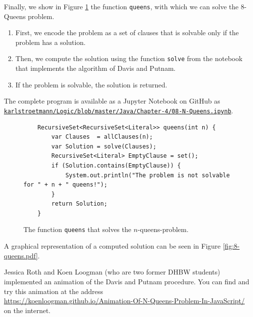 Finally, we show in Figure \ref{fig:solve:queens} the function
\texttt{queens}, with which we can solve the 8-Queens problem.
\begin{enumerate}
\item First, we encode the problem as a set of clauses that is solvable
      only if the problem has a solution.
\item Then, we compute the solution using the function \texttt{solve} from the notebook
      that implements the algorithm of Davis and Putnam.
\item If the problem is solvable, the solution is returned.
\end{enumerate}
The complete program is available as a Jupyter Notebook on GitHub as
\\[0.2cm]
\hspace*{1.3cm}
\href{https://github.com/karlstroetmann/Logic/blob/master/Java/Chapter-4/08-N-Queens.ipynb}{\texttt{karlstroetmann/Logic/blob/master/Java/Chapter-4/08-N-Queens.ipynb}}.




\begin{figure}[!ht]
\centering
\begin{verbatim}
    RecursiveSet<RecursiveSet<Literal>> queens(int n) {
        var Clauses  = allClauses(n);
        var Solution = solve(Clauses);
        RecursiveSet<Literal> EmptyClause = set();
        if (Solution.contains(EmptyClause)) {
            System.out.println("The problem is not solvable for " + n + " queens!");
        }
        return Solution;
    }
\end{verbatim} 
\vspace*{-0.3cm}
\caption{The function \texttt{queens} that solves the $n$-queens-problem.}
\label{fig:solve:queens}
\end{figure} %

A graphical representation of a computed solution can be seen in Figure \ref{fig:8-queens.pdf}.


Jessica Roth and Koen Loogman (who are two former DHBW students) implemented an animation of the Davis and Putnam procedure. You can find and try this animation at the address
\\[0.2cm]
\hspace*{1.3cm}
\href{https://koenloogman.github.io/Animation-Of-N-Queens-Problem-In-JavaScript/}{https://koenloogman.github.io/Animation-Of-N-Queens-Problem-In-JavaScript/}
\\[0.2cm]
on the internet.

